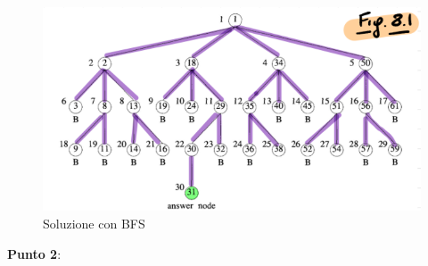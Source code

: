 \documentclass[a4paper]{article}
\begin{document}
\begin{itemize}
		\begin{figure}[!ht]
\centering
\includegraphics[width=1\textwidth]{./img/C_2_BFS.png}
\caption{Soluzione con BFS} \label{FIG:C_2_BFS}
\end{figure}
\end{itemize}
\textbf{Punto 2}:
\end{document}
